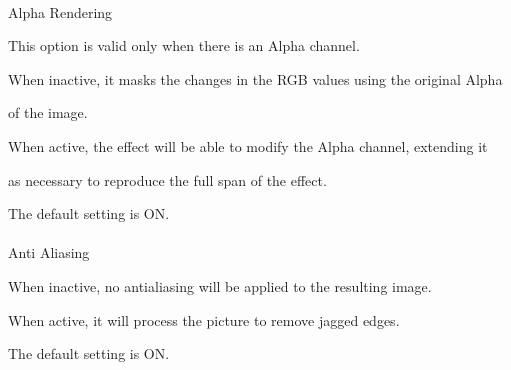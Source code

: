\documentclass[a4paper,12pt]{article}
\begin{document}
\thispagestyle{empty}

\ \vspace{-0.2em}
\\
Alpha Rendering\par
This option is valid only when there is an Alpha channel.\par
When inactive, it masks the changes in the RGB values using the original Alpha\par 
of the image.\par
When active, the effect will be able to modify the Alpha channel, extending it\par 
as necessary to reproduce the full span of the effect.\par
The default setting is ON.\\
\\
Anti Aliasing\par
When inactive, no antialiasing will be applied to the resulting image.\par
When active, it will process the picture to remove jagged edges.\par
The default setting is ON.
\end{document}

